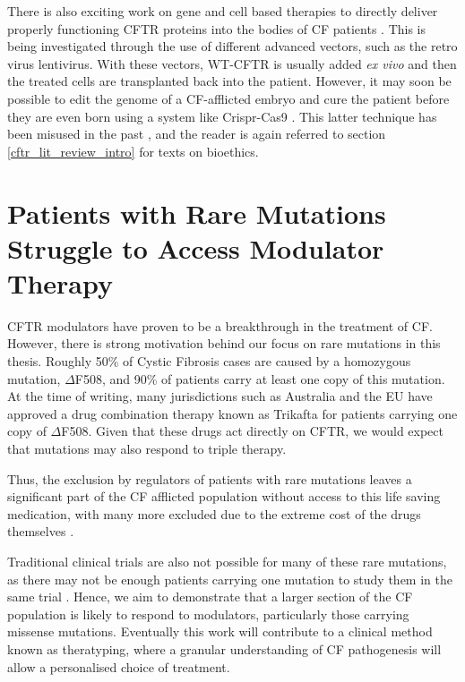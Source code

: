 There is also exciting work on gene and cell based therapies to directly deliver properly functioning CFTR proteins into the bodies of CF patients \cite{allan2021}. This is being investigated through the use of different advanced vectors, such as the retro virus lentivirus. With these vectors, WT-CFTR is usually added \textit{ex vivo} and then the treated cells are transplanted back into the patient. However, it  may soon be possible to edit the genome of a CF-afflicted embryo and cure the patient before they are even born using a system like Crispr-Cas9 \cite{ledford2020}. This latter technique has been misused in the past \cite{mallapaty2022}, and the reader is again referred to section \ref{cftr_lit_review_intro} for texts on bioethics. 

\section{Patients with Rare Mutations Struggle to Access Modulator Therapy}
CFTR modulators have proven to be a breakthrough in the treatment of CF. However, there is strong motivation behind our focus on rare mutations in this thesis. Roughly 50\% of Cystic Fibrosis cases are caused by a homozygous mutation, $\Delta$F508, and 90\% of patients carry at least one copy of this mutation. At the time of writing, many jurisdictions such as Australia and the EU have approved a drug combination therapy known as Trikafta for patients carrying one copy of $\Delta$F508. Given that these drugs act directly on CFTR, we would expect that mutations may also respond to triple therapy. 

Thus, the exclusion by regulators of patients with rare mutations leaves a significant part of the CF afflicted population without access to this life saving medication, with many more excluded due to the extreme cost of the drugs themselves \cite{administration2021, trikafta_website, abdallah2021, guo2022a}. 

Traditional clinical trials are also not possible for many of these rare mutations, as there may not be enough patients carrying one mutation to study them in the same trial \cite{grody2007}. Hence, we aim to demonstrate that a larger section of the CF population is likely to respond to modulators, particularly those carrying missense mutations. Eventually this work will contribute to a clinical method known as theratyping, where a granular understanding of CF pathogenesis will allow a personalised choice of treatment.

